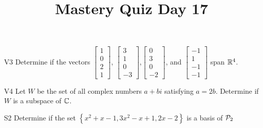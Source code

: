 \documentclass{sbgLAquiz}
\title{Mastery Quiz Day 17 }
\begin{document}
\begin{problem}{V3}
Determine if the vectors $\begin{bmatrix} 1 \\ 0 \\ 2 \\1 \end{bmatrix}$, $\begin{bmatrix} 3 \\ 1 \\ 0 \\ -3 \end{bmatrix}$,$\begin{bmatrix} 0 \\ 3 \\ 0 \\ -2 \end{bmatrix}$, and $\begin{bmatrix}-1 \\ 1 \\ -1 \\ -1 \end{bmatrix}$ span $\IR^4$.
\end{problem}

\begin{problem}{V4} Let \(W\) be the set of all complex numbers \(a+bi\)
satisfying  \(a=2b\).
Determine if \(W\) is a subspace of \(\IC\).
\end{problem}
\newpage

\begin{problem}{S2}
Determine if the set $\left\{ x^2+x-1, 3x^2-x+1, 2x-2 \right\}$ is a basis of $\P_2$
\end{problem}
\end{document}
